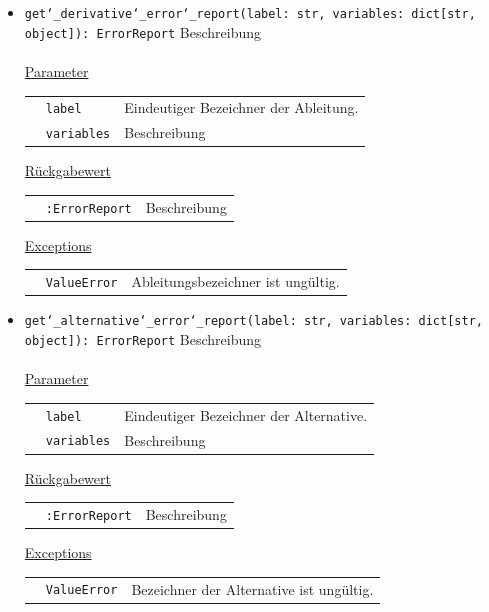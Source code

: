 \documentclass{article}
\begin{document}
\begin{itemize}
\item \texttt{get\char`_derivative\char`_error\char`_report(label: str, variables: dict[str, object]): ErrorReport} \newline Beschreibung
\\\\
\underline{{Parameter}}

\begin{tabular}{lll}
 & \texttt{label} & Eindeutiger Bezeichner der Ableitung.  \\
 & \texttt{variables} & Beschreibung \\
\end{tabular}

\underline{{Rückgabewert}}

\begin{tabular}{lll}
 & \texttt{:ErrorReport} & Beschreibung \\
\end{tabular}

\underline{Exceptions}\\
\begin{tabular}{lll}
 & \texttt{ValueError} & Ableitungsbezeichner ist ungültig.\\
\end{tabular}



\item \texttt{get\char`_alternative\char`_error\char`_report(label: str, variables: dict[str, object]): ErrorReport} \newline Beschreibung
\\\\
\underline{{Parameter}}

\begin{tabular}{lll}
 & \texttt{label} & Eindeutiger Bezeichner der Alternative. \\
 & \texttt{variables} & Beschreibung \\
\end{tabular}

\underline{{Rückgabewert}}

\begin{tabular}{lll}
 & \texttt{:ErrorReport} & Beschreibung \\
\end{tabular}

\underline{Exceptions}\\
\begin{tabular}{lll}
 & \texttt{ValueError} & Bezeichner der Alternative ist ungültig.\\
\end{tabular}
\end{itemize}
\end{document}
